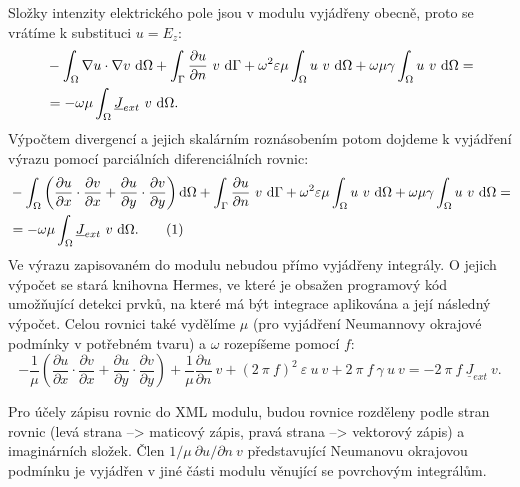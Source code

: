 \documentclass[12pt,a4paper,oneside]{article}
\numberwithin{equation}{section} %
\numberwithin{figure}{section} %
\numberwithin{table}{section} %
\newcommand{\faz}[1]{{\underline{#1}}} %
\newcommand\numberthis{\addtocounter{equation}{1}\tag{\theequation}}
\begin{document}
Složky intenzity elektrického pole jsou v modulu vyjádřeny obecně, proto se vrátíme k substituci $u = E_z$:
\begin{equation}
\begin{split}
&- \int _{\Omega} \nabla u \cdot \nabla v ~ \ud \Omega + \int _{\Gamma} \frac{\partial u}{\partial n} ~ v ~ \ud \Gamma + \omega ^2 \varepsilon \mu \int _{\Omega} u ~ v ~ \ud \Omega + \omega \mu \gamma \int _{\Omega} u ~ v ~ \ud \Omega =\\
&= - \omega \mu \int _{\Omega} \faz{J} _{ext} ~ v ~ \ud \Omega .
\end{split}
\end{equation}
Výpočtem divergencí a jejich skalárním roznásobením potom dojdeme k vyjádření výrazu pomocí parciálních diferenciálních rovnic:
\begin{align*}
&- \int _{\Omega} \left( \frac{\partial u}{\partial x} \cdot \frac{\partial v}{\partial x} + \frac{\partial u}{\partial y} \cdot \frac{\partial v}{\partial y} \right) \ud \Omega + \int _{\Gamma} \frac{\partial u}{\partial n} ~ v ~ \ud \Gamma + \omega ^2 \varepsilon \mu \int _{\Omega} u ~ v ~ \ud \Omega + \omega \mu \gamma \int _{\Omega} u ~ v ~ \ud \Omega =\\
&= - \omega \mu \int _{\Omega} \faz{J} _{ext} ~ v ~ \ud \Omega .
\numberthis
\end{align*}
Ve výrazu zapisovaném do modulu nebudou přímo vyjádřeny integrály. O jejich výpočet se stará knihovna Hermes, ve které je obsažen programový kód umožňující detekci prvků, na které má být integrace aplikována a její následný výpočet. Celou rovnici také vydělíme $\mu$ (pro vyjádření Neumannovy okrajové podmínky v potřebném tvaru) a $\omega$ rozepíšeme pomocí $f$:
\begin{equation}
\label{EzWeakEpsilon}
- \frac{1}{\mu} \left( \frac{\partial u}{\partial x} \cdot \frac{\partial v}{\partial x} + \frac{\partial u}{\partial y} \cdot \frac{\partial v}{\partial y} \right) + \frac{1}{\mu} \frac{\partial u}{\partial n} ~ v + (2 ~ \pi ~ f) ^2 ~ \varepsilon ~ u ~ v + 2 ~ \pi ~ f ~ \gamma ~ u ~ v = - 2 ~ \pi ~ f ~ \faz{J} _{ext} ~ v .
\end{equation}

Pro účely zápisu rovnic do XML modulu, budou rovnice rozděleny podle stran rovnic (levá strana --> maticový zápis, pravá strana --> vektorový zápis) a imaginárních složek. Člen $1/ \mu ~ \partial u / \partial n ~ v$ představující Neumanovu okrajovou podmínku je vyjádřen v jiné části modulu věnující se povrchovým integrálům.
\end{document}
